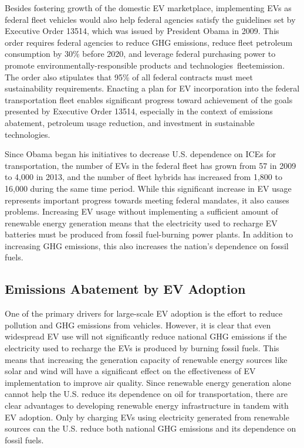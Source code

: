 Besides fostering growth of the domestic EV marketplace, implementing EVs as federal fleet vehicles would also help federal agencies satisfy the guidelines set by Executive Order 13514, which was issued by President Obama in 2009. This order requires federal agencies to reduce GHG emissions, reduce fleet petroleum consumption by 30\% before 2020, and leverage federal purchasing power to promote environmentally-responsible products and technologies~\cite{eric}{fleetemission}. The order also stipulates that 95\% of all federal contracts must meet sustainability requirements. Enacting a plan for EV incorporation into the federal transportation fleet enables significant progress toward achievement of the goals presented by Executive Order 13514, especially in the context of emissions abatement, petroleum usage reduction, and investment in sustainable technologies.

Since Obama began his initiatives to decrease U.S. dependence on ICEs for transportation, the number of EVs in the federal fleet has grown from 57 in 2009 to 4,000 in 2013, and the number of fleet hybrids has increased from 1,800 to 16,000 during the same time period. While this significant increase in EV usage represents important progress towards meeting federal mandates, it also causes problems. Increasing EV usage without implementing a sufficient amount of renewable energy generation means that the electricity used to recharge EV batteries must be produced from fossil fuel-burning power plants. In addition to increasing GHG emissions, this also increases the nation's dependence on fossil fuels. 




\subsection{Emissions Abatement by EV Adoption}

One of the primary drivers for large-scale EV adoption is the effort to reduce pollution and GHG emissions from vehicles. However, it is clear that even widespread EV use will not significantly reduce national GHG emissions if the electricity used to recharge the EVs is produced by burning fossil fuels. This means that increasing the generation capacity of renewable energy sources like solar and wind will have a significant effect on the effectiveness of EV implementation to improve air quality. Since renewable energy generation alone cannot help the U.S. reduce its dependence on oil for transportation, there are clear advantages to developing renewable energy infrastructure in tandem with EV adoption. Only by charging EVs using electricity generated from renewable sources can the U.S. reduce both national GHG emissions and its dependence on fossil fuels.

